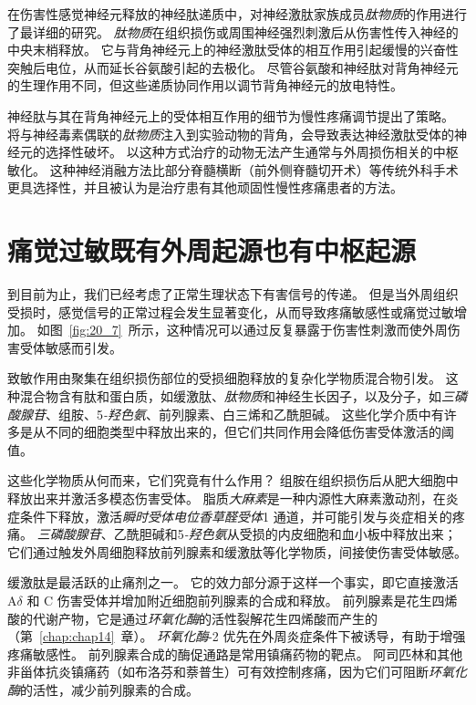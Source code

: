 在伤害性感觉神经元释放的神经肽递质中，对神经激肽家族成员\textit{肽物质}的作用进行了最详细的研究。
\textit{肽物质}在组织损伤或周围神经强烈刺激后从伤害性传入神经的中央末梢释放。
它与背角神经元上的神经激肽受体的相互作用引起缓慢的兴奋性突触后电位，从而延长谷氨酸引起的去极化。
尽管谷氨酸和神经肽对背角神经元的生理作用不同，但这些递质协同作用以调节背角神经元的放电特性。


神经肽与其在背角神经元上的受体相互作用的细节为慢性疼痛调节提出了策略。
将与神经毒素偶联的\textit{肽物质}注入到实验动物的背角，会导致表达神经激肽受体的神经元的选择性破坏。
以这种方式治疗的动物无法产生通常与外周损伤相关的中枢敏化。
这种神经消融方法比部分脊髓横断（前外侧脊髓切开术）等传统外科手术更具选择性，并且被认为是治疗患有其他顽固性慢性疼痛患者的方法。



\section{痛觉过敏既有外周起源也有中枢起源}

到目前为止，我们已经考虑了正常生理状态下有害信号的传递。
但是当外周组织受损时，感觉信号的正常过程会发生显著变化，从而导致疼痛敏感性或痛觉过敏增加。
如图~\ref{fig:20_7}~所示，这种情况可以通过反复暴露于伤害性刺激而使外周伤害受体敏感而引发。


致敏作用由聚集在组织损伤部位的受损细胞释放的复杂化学物质混合物引发。
这种混合物含有肽和蛋白质，如缓激肽、\textit{肽物质}和神经生长因子，以及分子，如\textit{三磷酸腺苷}、组胺、5\textit{-羟色氨}、前列腺素、白三烯和乙酰胆碱。
这些化学介质中有许多是从不同的细胞类型中释放出来的，但它们共同作用会降低伤害受体激活的阈值。


这些化学物质从何而来，它们究竟有什么作用？
组胺在组织损伤后从肥大细胞中释放出来并激活多模态伤害受体。
脂质\textit{大麻素}是一种内源性大麻素激动剂，在炎症条件下释放，激活\textit{瞬时受体电位香草醛受体}1 通道，并可能引发与炎症相关的疼痛。
\textit{三磷酸腺苷}、乙酰胆碱和5\textit{-羟色氨}从受损的内皮细胞和血小板中释放出来；
它们通过触发外周细胞释放前列腺素和缓激肽等化学物质，间接使伤害受体敏感。


缓激肽是最活跃的止痛剂之一。
它的效力部分源于这样一个事实，即它直接激活 A$\delta$ 和 C 伤害受体并增加附近细胞前列腺素的合成和释放。
前列腺素是花生四烯酸的代谢产物，它是通过\textit{环氧化酶}的活性裂解花生四烯酸而产生的（第~\ref{chap:chap14}~章）。
\textit{环氧化酶}-2 优先在外周炎症条件下被诱导，有助于增强疼痛敏感性。
前列腺素合成的酶促通路是常用镇痛药物的靶点。
阿司匹林和其他非甾体抗炎镇痛药（如布洛芬和萘普生）可有效控制疼痛，因为它们可阻断\textit{环氧化酶}的活性，减少前列腺素的合成。


